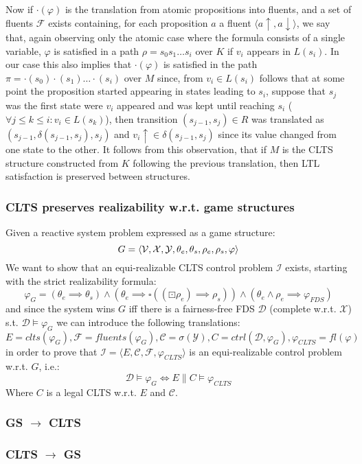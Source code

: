 Now if $\cdot(\varphi)$ is the translation from atomic propositions into fluents, and a set of fluents $\mathcal{F}$ exists containing, for each proposition $a$ a fluent $\langle a\uparrow, a\downarrow \rangle$, we say that, again observing only the atomic case where the formula consists of a single variable, $\varphi$ is satisfied in a path $\rho=s_0 s_1\ldots s_i$ over $K$ if $v_i$ appears in $L(s_i)$. In our case this also implies that $\cdot(\varphi)$ is satisfied in the path $\pi=\cdot(s_0)\cdot(s_1)\ldots \cdot(s_i)$ over $M$ since, from $v_i \in L(s_i)$ follows that at some point the proposition started appearing in states leading to $s_i$, suppose that $s_j$ was the first state were $v_i$ appeared and was kept until reaching $s_i$ ($\forall j \leq k \leq i: v_i \in L(s_k)$), then transition $(s_{j-1},s_j) \in R$ was translated as $(s_{j-1}, \delta(s_{j-1},s_j),s_j)$ and $v_i\uparrow \in \delta(s_{j-1},s_j)$ since its value changed from one state to the other. It follows from this observation, that if $M$ is the CLTS structure constructed from $K$ following the previous translation, then LTL satisfaction is preserved between structures.


\newpage
\subsubsection{CLTS preserves realizability w.r.t. game structures}
Given a reactive system problem expressed as a game structure:
\[G = \langle {\mathcal{V}}, {\mathcal{X}}, {\mathcal{Y}}, {\theta_e}, {\theta_s}, {\rho_e}, {\rho_s}, \varphi \rangle\]
We want to show that an equi-realizable CLTS control problem $\mathcal{I}$  exists, starting with the strict realizability formula:
\[\varphi_G = (\theta_e \implies \theta_s) \wedge (\theta_e \implies \square((\boxdot \rho_e) \implies \rho_s)) \wedge (\theta_e \wedge \rho_e \implies \varphi_{FDS}) \]
and since the system wins $G$ iff there is a fairness-free FDS $\mathcal{D}$ (complete w.r.t. $\mathcal{X}$) s.t. $\mathcal{D} \models \varphi_G$ we can introduce the following translations:
\[E = clts(\varphi_G),\mathcal{F} = fluents(\varphi_G),\mathcal{C} = \sigma(\mathcal{Y}),C= ctrl(\mathcal{D},\varphi_G),\varphi_{CLTS} = fl(\varphi)\]
in order to prove that $\mathcal{I} = \langle E, \mathcal{C}, \mathcal{F}, \varphi_{CLTS} \rangle$ is an equi-realizable control problem w.r.t. $G$, i.e.: 
\[\mathcal{D}\models \varphi_G \iff E \parallel C \models \varphi_{CLTS}\]
Where $C$ is a legal CLTS w.r.t. $E$ and $\mathcal{C}$.
\newpage
\subsubsection{GS $\rightarrow$ CLTS}


%

\newpage
\subsubsection{CLTS $\rightarrow$ GS}


%
\newpage

